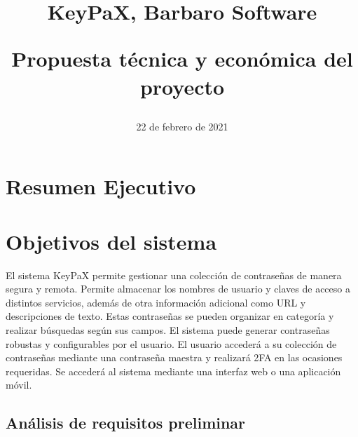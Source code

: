 \documentclass{article}
\title{
\Huge{KeyPaX, Barbaro Software} \\ 
\begin{Large} 
Propuesta técnica y económica    del proyecto
\end{Large}}
\date{22 de febrero de 2021}
\begin{document}
\maketitle

\pagebreak 

\tableofcontents

\pagebreak

\section{Resumen Ejecutivo}


\pagebreak

\section{Objetivos del sistema}


El sistema KeyPaX permite gestionar una colección de contraseñas de manera segura y remota. Permite almacenar los nombres de usuario y claves de acceso a distintos servicios, además de otra información adicional como URL y descripciones de texto. Estas contraseñas se pueden organizar en categoría y realizar búsquedas según sus campos. El sistema puede generar contraseñas robustas y configurables por el usuario. El usuario accederá a su colección de contraseñas mediante una contraseña maestra y realizará 2FA en las ocasiones requeridas. Se accederá al sistema mediante una interfaz web o una aplicación móvil.

\subsection{Análisis de requisitos preliminar}


\end{document}
